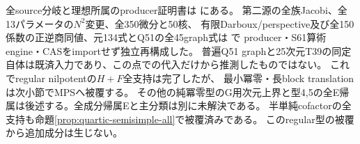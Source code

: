 \documentclass[a4paper,11pt]{ltjsarticle}
\theoremstyle{definition}
\begin{document}
全source分岐と理想所属のproducer証明書は
にある。
第二源の全族Jacobi、全13パラメータの$N^2$変更、全350微分と50核、
有限Darboux/perspective及び全150係数の正逆商同値、元134式とQ51の全45graph式は
で
producer・S61算術engine・CASをimportせず独立再構成した。
普遍Q51 graphと25次元T39の同定自体は既済入力であり、この点での代入だけから推測したものではない。
これでregular nilpotentの$H+F$全支持は完了したが、
最小冪零・長block translationは次小節でMPSへ被覆する。
その他の純冪零型のG用次元上界と型4,5の全E帰属は後述する。全成分帰属Eと主分類は別に未解決である。
半単純cofactorの全支持も命題\ref{prop:quartic-semisimple-all}で被覆済みである。
このregular型の被覆から追加成分は生じない。
\end{document}
